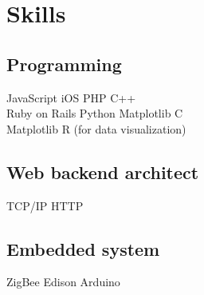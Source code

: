 \documentclass[letterpaper]{deedy-resume} %
\begin{document}
\begin{minipage}[t]{0.33\textwidth}
\sectionspace %


\section{Skills}

\subsection{Programming}

JavaScript \textbullet{} iOS \textbullet{} PHP \textbullet{} C++  \\
Ruby on Rails \textbullet{} Python \textbullet{} Matplotlib \textbullet{} C \\
Matplotlib \textbullet{} R (for data visualization)

\vspace{2mm} 

\subsection{Web backend architect}

TCP/IP \textbullet{} HTTP 

\vspace{2mm} 

\subsection{Embedded system}
ZigBee \textbullet{} Edison \textbullet{} Arduino


\sectionspace %


\end{minipage} %
\hfill
%
%
\end{document}
